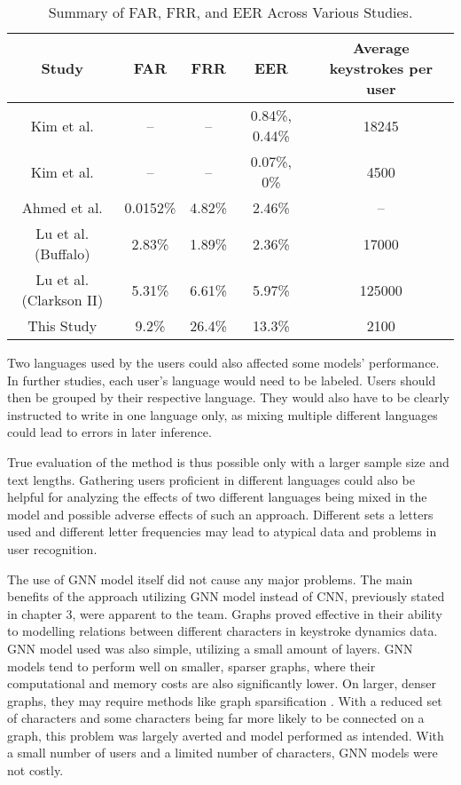 \begin{center}
	\begin{table}[H]
		\begin{center}
			\begin{tabular}{ |c|c|c|c|c| } 
				\hline
				Study & FAR & FRR & EER & Average keystrokes per user \\
				\hline
				Kim et al. \cite{kim2018} & -- & -- & 0.84\%, 0.44\% & 18245 \\
				\hline
				Kim et al. \cite{kim2020} & -- & -- & 0.07\%, 0\% & 4500 \\
				\hline
				Ahmed et al. \cite{ahmed2013} & 0.0152\% & 4.82\% & 2.46\% & -- \\
				\hline
				Lu et al. \cite{Lu2020} (Buffalo) & 2.83\% & 1.89\% & 2.36\% & 17000 \\
                \hline
                Lu et al. \cite{Lu2020} (Clarkson II) & 5.31\% & 6.61\% & 5.97\% & 125000 \\
                \hline
				This Study & 9.2\% & 26.4\% & 13.3\% & 2100 \\
				\hline
			\end{tabular}
		\end{center}
		\caption{Summary of FAR, FRR, and EER Across Various Studies.}
		\label{table:studies_results}
	\end{table}
\end{center}

Two languages used by the users could also affected some models' performance. In further studies, each user's language would need to be labeled. Users should then be grouped by their respective language. They would also have to be clearly instructed to write in one language only, as mixing multiple different languages could lead to errors in later inference. 

True evaluation of the method is thus possible only with a larger sample size and text lengths. Gathering users proficient in different languages could also be helpful for analyzing the effects of two different languages being mixed in the model and possible adverse effects of such an approach. Different sets a letters used and different letter frequencies may lead to atypical data and problems in user recognition.

The use of GNN model itself did not cause any major problems. The main benefits of the approach utilizing GNN model instead of CNN, previously stated in chapter 3, were apparent to the team. Graphs proved effective in their ability to modelling relations between different characters in keystroke dynamics data. GNN model used was also simple, utilizing a small amount of layers. GNN models tend to perform well on smaller, sparser graphs, where their computational and memory costs are also significantly lower. On larger, denser graphs, they may require methods like graph sparsification \cite{zhang2024graphsparsificationmixturegraphs}. With a reduced set of characters and some characters being far more likely to be connected on a graph, this problem was largely averted and model performed as intended. With a small number of users and a limited number of characters, GNN models were not costly.